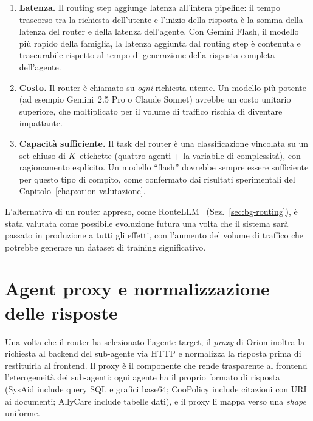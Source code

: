 \begin{enumerate}
  \item \textbf{Latenza.} Il routing step aggiunge latenza all'intera pipeline: 
  il tempo trascorso tra la richiesta dell'utente e l'inizio della risposta è la somma della latenza del router e della latenza dell'agente. 
  Con Gemini Flash, il modello più rapido della famiglia, la latenza aggiunta dal routing step è contenuta e trascurabile rispetto al tempo di generazione della risposta completa dell'agente.
  \item \textbf{Costo.} Il router è chiamato su \emph{ogni} richiesta utente. Un modello più potente (ad esempio Gemini~2.5 Pro o Claude Sonnet) avrebbe un costo unitario superiore, 
  che moltiplicato per il volume di traffico rischia di diventare impattante.
  \item \textbf{Capacità sufficiente.} Il task del router è una classificazione 
  vincolata su un set chiuso di $K$~etichette (quattro agenti + la variabile di complessità), con ragionamento esplicito. 
  Un modello ``flash'' dovrebbe sempre essere sufficiente per questo tipo di compito,
  come confermato dai risultati sperimentali del Capitolo~\ref{chap:orion-valutazione}.
\end{enumerate}

L'alternativa di un router appreso, come RouteLLM~\cite{ong2024routellm} (Sez.~\ref{sec:bg-routing}), 
è stata valutata come possibile evoluzione futura una volta che il sistema 
sarà passato in produzione a tutti gli effetti, con l'aumento del volume di traffico
che potrebbe generare un dataset di training significativo.

\section{Agent proxy e normalizzazione delle risposte}
\label{sec:orion-proxy}

Una volta che il router ha selezionato l'agente target, il \emph{proxy} di Orion inoltra 
la richiesta al backend del sub-agente via HTTP e normalizza la risposta prima di restituirla al frontend. 
Il proxy è il componente che rende trasparente al frontend l'eterogeneità dei sub-agenti: 
ogni agente ha il proprio formato di risposta (SysAid include query SQL e grafici base64; CooPolicy include citazioni con URI ai documenti; AllyCare include tabelle dati), 
e il proxy li mappa verso una \emph{shape} uniforme.

